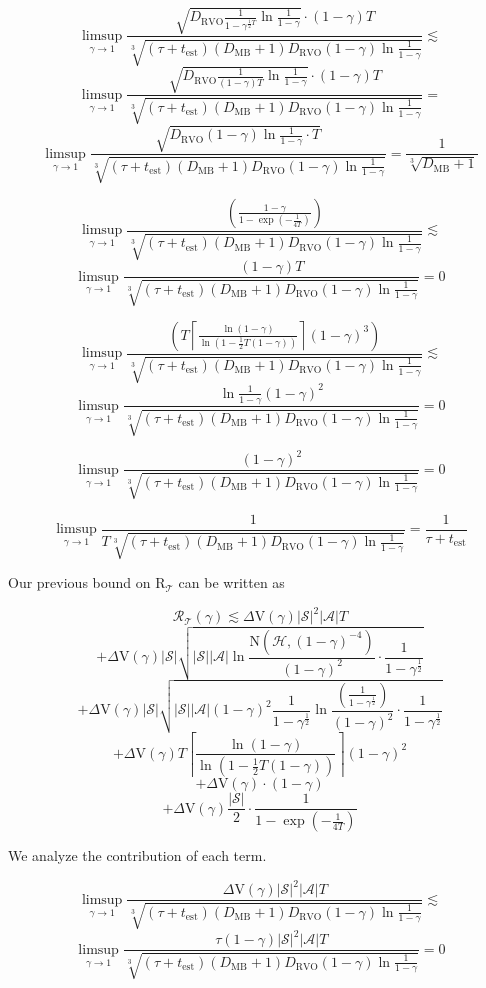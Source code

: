 \documentclass[a4paper]{article}
\newcommand{\AP}[1]{\left(#1\right)}
\newcommand{\Abs}[1]{\left\vert #1 \right\vert}
\newcommand{\Ceil}[1]{\left\lceil #1 \right\rceil}
\newcommand{\St}{\mathcal{S}}
\newcommand{\A}{\mathcal{A}}
\newcommand{\R}{\mathcal{R}}
\newcommand{\T}{\mathcal{T}}
\newcommand{\Hy}{\mathcal{H}}
\newcommand{\DRVO}{D_{\mathrm{RVO}}}
\newcommand{\DMB}{D_{\mathrm{MB}}}
\newcommand{\Est}{\mathrm{est}}
\newcommand{\V}{\mathrm{V}}
\newcommand{\Reg}{\mathrm{R}}
\newcommand{\N}{\mathrm{N}}
\begin{document}
$$\limsup_{\gamma \rightarrow 1}\frac{\sqrt{\DRVO\frac{1}{1-\gamma^{\frac{1}{2}T}}\ln\frac{1}{1-\gamma}}\cdot(1-\gamma)T}{\sqrt[3]{\AP{\tau+t_{\Est}}\AP{\DMB+1}\DRVO(1-\gamma)\ln{\frac{1}{1-\gamma}}}}\lesssim$$
$$\limsup_{\gamma \rightarrow 1}\frac{\sqrt{\DRVO\frac{1}{(1-\gamma)T}\ln\frac{1}{1-\gamma}}\cdot(1-\gamma)T}{\sqrt[3]{\AP{\tau+t_{\Est}}\AP{\DMB+1}\DRVO(1-\gamma)\ln{\frac{1}{1-\gamma}}}}=$$
$$\limsup_{\gamma \rightarrow 1}\frac{\sqrt{\DRVO(1-\gamma)\ln\frac{1}{1-\gamma}\cdot T}}{\sqrt[3]{\AP{\tau+t_{\Est}}\AP{\DMB+1}\DRVO(1-\gamma)\ln{\frac{1}{1-\gamma}}}}=\frac{1}{\sqrt[3]{\DMB+1}}$$

$$\limsup_{\gamma \rightarrow 1}\frac{\AP{\frac{1-\gamma}{1-\exp\AP{-\frac{1}{4T}}}}}{\sqrt[3]{\AP{\tau+t_{\Est}}\AP{\DMB+1}\DRVO(1-\gamma)\ln{\frac{1}{1-\gamma}}}}\lesssim$$
$$\limsup_{\gamma \rightarrow 1}\frac{(1-\gamma)T}{\sqrt[3]{\AP{\tau+t_{\Est}}\AP{\DMB+1}\DRVO(1-\gamma)\ln{\frac{1}{1-\gamma}}}}=0$$

$$\limsup_{\gamma \rightarrow 1}\frac{\AP{T\Ceil{\frac{\ln(1-\gamma)}{\ln\AP{1-\frac{1}{2}T(1-\gamma)}}}(1-\gamma)^3}}{\sqrt[3]{\AP{\tau+t_{\Est}}\AP{\DMB+1}\DRVO(1-\gamma)\ln{\frac{1}{1-\gamma}}}}\lesssim$$
$$\limsup_{\gamma \rightarrow 1}\frac{\ln\frac{1}{1-\gamma}(1-\gamma)^2}{\sqrt[3]{\AP{\tau+t_{\Est}}\AP{\DMB+1}\DRVO(1-\gamma)\ln{\frac{1}{1-\gamma}}}}=0$$

$$\limsup_{\gamma \rightarrow 1}\frac{(1-\gamma)^2}{\sqrt[3]{\AP{\tau+t_{\Est}}\AP{\DMB+1}\DRVO(1-\gamma)\ln{\frac{1}{1-\gamma}}}}=0$$

$$\limsup_{\gamma \rightarrow 1}\frac{1}{T\sqrt[3]{\AP{\tau+t_{\Est}}\AP{\DMB+1}\DRVO(1-\gamma)\ln{\frac{1}{1-\gamma}}}}=\frac{1}{\tau+t_\Est}$$

Our previous bound on $\Reg_\T$ can be written as

$$\R_\T(\gamma)\lesssim\Delta\V(\gamma)\Abs{\St}^2\Abs{\A} T$$
$$+\Delta\V(\gamma)\Abs{\St}\sqrt{\Abs{\St}\Abs{\A}\ln{\frac{\N(\Hy,(1-\gamma)^{-4} )}{(1-\gamma)^2}}\cdot\frac{1}{1-\gamma^{\frac{1}{2}}}}$$
$$+\Delta\V(\gamma)\Abs{\St}\sqrt{\Abs{\St}\Abs{\A}(1-\gamma)^{2} \frac{1}{1-\gamma^{\frac{1}{2}}}\ln{\frac{\AP{\frac{1}{1-\gamma^{\frac{1}{2}}}}}{(1-\gamma)^2}}\cdot\frac{1}{1-\gamma^{\frac{1}{2}}}}$$
$$+\Delta\V(\gamma)T\Ceil{\frac{\ln(1-\gamma)}{\ln\AP{1-\frac{1}{2}T(1-\gamma)}}}(1-\gamma)^2$$
$$+\Delta\V(\gamma)\cdot(1-\gamma)$$
$$+\Delta\V(\gamma)\frac{\Abs{\St}}{2}\cdot\frac{1}{1-\exp\AP{-\frac{1}{4T}}}$$

We analyze the contribution of each term.

$$\limsup_{\gamma \rightarrow 1}\frac{\Delta\V(\gamma)\Abs{\St}^2\Abs{\A} T}{\sqrt[3]{\AP{\tau+t_{\Est}}\AP{\DMB+1}\DRVO(1-\gamma)\ln{\frac{1}{1-\gamma}}}}\lesssim$$
$$\limsup_{\gamma \rightarrow 1}\frac{\tau(1-\gamma)\Abs{\St}^2\Abs{\A} T}{\sqrt[3]{\AP{\tau+t_{\Est}}\AP{\DMB+1}\DRVO(1-\gamma)\ln{\frac{1}{1-\gamma}}}}=0$$
\end{document}
